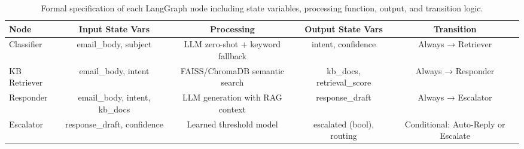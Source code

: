 \begin{table}
\caption{Formal specification of each LangGraph node including state variables, processing function, output, and transition logic.}
\label{tab:tab02_node_specification}
\begin{tabular}{lcccc}
\toprule
Node & Input State Vars & Processing & Output State Vars & Transition \\
\midrule
Classifier & email\_body, subject & LLM zero-shot + keyword fallback & intent, confidence & Always → Retriever \\
KB Retriever & email\_body, intent & FAISS/ChromaDB semantic search & kb\_docs, retrieval\_score & Always → Responder \\
Responder & email\_body, intent, kb\_docs & LLM generation with RAG context & response\_draft & Always → Escalator \\
Escalator & response\_draft, confidence & Learned threshold model & escalated (bool), routing & Conditional: Auto-Reply or Escalate \\
\bottomrule
\end{tabular}
\end{table}

